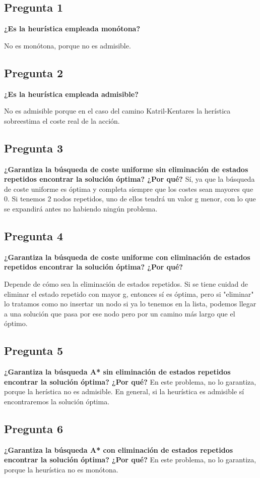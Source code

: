  \subsection*{Pregunta 1}\textbf{¿Es la heurística empleada monótona?}

 No es monótona, porque no es admisible.

\subsection*{Pregunta 2} \textbf{¿Es la heurística empleada admisible?}

No es admisible porque en el caso del camino Katril-Kentares la herística sobreestima el coste real de la acción.

\subsection*{Pregunta 3}\textbf{¿Garantiza la búsqueda de coste uniforme sin eliminación de estados repetidos encontrar la solución óptima? ¿Por qué?}
Sí, ya que la búsqueda de coste uniforme es óptima y completa siempre que los costes sean mayores que 0. Si tenemos 2 nodos repetidos, uno de ellos tendrá un valor g menor, con lo que se expandirá antes no habiendo ningún problema.

\subsection*{Pregunta 4}\textbf{ ¿Garantiza la búsqueda de coste uniforme con eliminación de estados repetidos encontrar la solución óptima? ¿Por qué?}

Depende de cómo sea la eliminación de estados repetidos. Si se tiene cuidad de eliminar el estado repetido con mayor g, entonces sí es óptima, pero si "eliminar" lo tratamos como no insertar un nodo si ya lo tenemos en la lista, podemos llegar a una solución que pasa por ese nodo pero por un camino más largo que el óptimo.

\subsection*{Pregunta 5}\textbf{¿Garantiza la búsqueda A* sin eliminación de estados repetidos encontrar la solución óptima? ¿Por qué?}
En este problema, no lo garantiza, porque la herística no es admisible. En general, si la heurística es admisible sí encontraremos la solución óptima.

\subsection*{Pregunta 6}\textbf{ ¿Garantiza la búsqueda A* con eliminación de estados repetidos encontrar la solución óptima? ¿Por qué?}
En este problema, no lo garantiza, porque la heurística no es monótona. 

